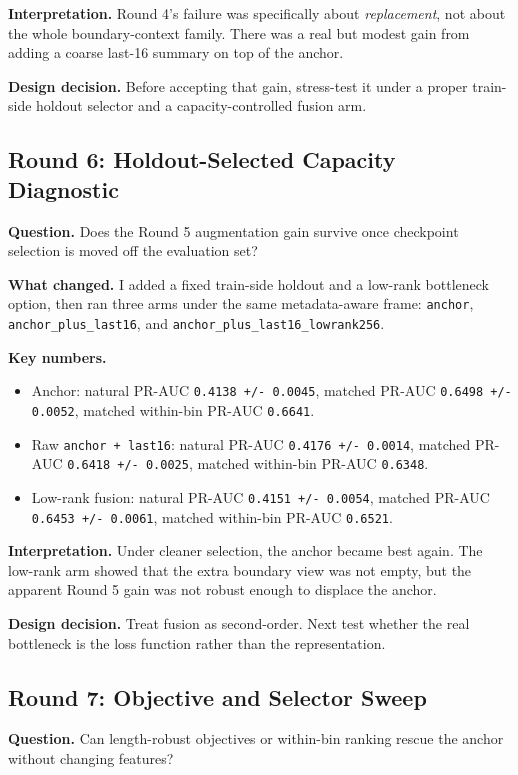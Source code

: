 \documentclass[11pt]{article}
\begin{document}
\textbf{Interpretation.} Round 4's failure was specifically about \emph{replacement}, not about the whole boundary-context family. There was a real but modest gain from adding a coarse last-16 summary on top of the anchor.

\textbf{Design decision.} Before accepting that gain, stress-test it under a proper train-side holdout selector and a capacity-controlled fusion arm.

\subsection*{Round 6: Holdout-Selected Capacity Diagnostic}
\textbf{Question.} Does the Round 5 augmentation gain survive once checkpoint selection is moved off the evaluation set?

\textbf{What changed.} I added a fixed train-side holdout and a low-rank bottleneck option, then ran three arms under the same metadata-aware frame:
\texttt{anchor},
\texttt{anchor\_plus\_last16},
and \texttt{anchor\_plus\_last16\_lowrank256}.

\textbf{Key numbers.}
\begin{itemize}
  \item Anchor:
    natural PR-AUC \texttt{0.4138 +/- 0.0045},
    matched PR-AUC \texttt{0.6498 +/- 0.0052},
    matched within-bin PR-AUC \texttt{0.6641}.
  \item Raw \texttt{anchor + last16}:
    natural PR-AUC \texttt{0.4176 +/- 0.0014},
    matched PR-AUC \texttt{0.6418 +/- 0.0025},
    matched within-bin PR-AUC \texttt{0.6348}.
  \item Low-rank fusion:
    natural PR-AUC \texttt{0.4151 +/- 0.0054},
    matched PR-AUC \texttt{0.6453 +/- 0.0061},
    matched within-bin PR-AUC \texttt{0.6521}.
\end{itemize}

\textbf{Interpretation.} Under cleaner selection, the anchor became best again. The low-rank arm showed that the extra boundary view was not empty, but the apparent Round 5 gain was not robust enough to displace the anchor.

\textbf{Design decision.} Treat fusion as second-order. Next test whether the real bottleneck is the loss function rather than the representation.

\subsection*{Round 7: Objective and Selector Sweep}
\textbf{Question.} Can length-robust objectives or within-bin ranking rescue the anchor without changing features?
\end{document}
